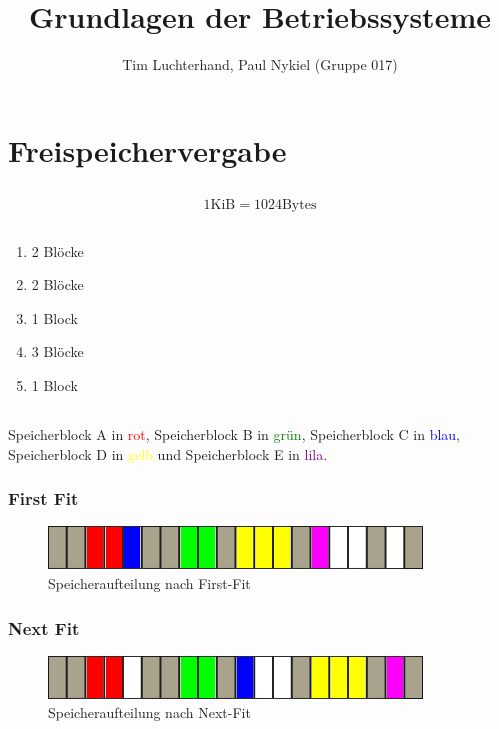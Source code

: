 \documentclass[DIN, pagenumber=false, fontsize=11pt, parskip=half]{scrartcl}
\title{Grundlagen der Betriebssysteme}
\author{Tim Luchterhand, Paul Nykiel (Gruppe 017)}
\begin{document}
    \maketitle
    \section{Freispeichervergabe}
    \subsection{}
    \begin{equation*}
        1 \text{KiB} = 1024 \text{Bytes}
    \end{equation*}

    \subsection{}
    \begin{enumerate}[label=\Alph*]
        \item 2 Blöcke
        \item 2 Blöcke
        \item 1 Block
        \item 3 Blöcke
        \item 1 Block
    \end{enumerate}

    \subsection{}
    Speicherblock A in \textcolor{red}{rot}, Speicherblock B in \textcolor{green}{grün}, Speicherblock C in \textcolor{blue}{blau},
    Speicherblock D in \textcolor{yellow}{gelb} und Speicherblock E in \textcolor{purple}{lila}.
    \subsubsection{First Fit}
    \begin{figure}[H]
        \centering
        \includegraphics[width=\textwidth]{firstFit.png}
        \caption{Speicheraufteilung nach First-Fit}
    \end{figure}
    \subsubsection{Next Fit}
    \begin{figure}[H]
        \centering
        \includegraphics[width=\textwidth]{nextFit.png}
        \caption{Speicheraufteilung nach Next-Fit}
    \end{figure}
\end{document}
